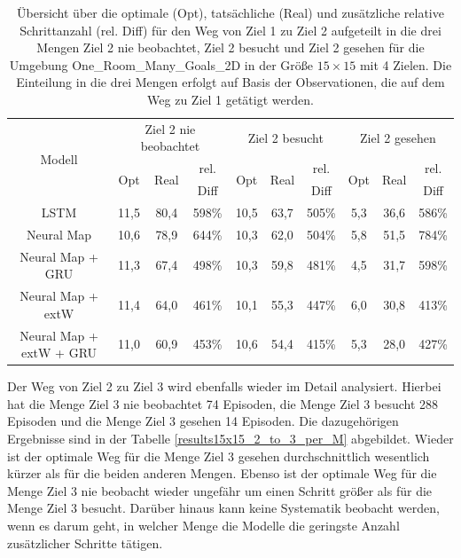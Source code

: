\begin{table}
  \begin{tabular}{|c|c|c|c|c|c|c|c|c|c|}
    \hline
    \multirow{3}{*}{Modell} & \multicolumn{3}{|c|}{Ziel 2 nie beobachtet} & \multicolumn{3}{|c|}{Ziel 2 besucht} & \multicolumn{3}{|c|}{Ziel 2 gesehen} \\ \cline{2-10}
    & \multirow{2}{*}{Opt} & \multirow{2}{*}{Real} & rel. & \multirow{2}{*}{Opt} & \multirow{2}{*}{Real} & rel. & \multirow{2}{*}{Opt} & \multirow{2}{*}{Real} & rel. \\
    & & & Diff & & & Diff & & & Diff \\ \hline
    LSTM & 11,5 & 80,4 & 598\% & 10,5 & 63,7 & 505\% & 5,3 & 36,6 & 586\% \\ \hline
    Neural Map & 10,6 & 78,9 & 644\% & 10,3 & 62,0 & 504\% & 5,8 & 51,5 & 784\% \\ \hline
    Neural Map + GRU & 11,3 & 67,4 & 498\% & 10,3 & 59,8 & 481\% & 4,5 & 31,7 & 598\% \\ \hline
    Neural Map + extW & 11,4 & 64,0 & 461\% & 10,1 & 55,3 & 447\% & 6,0 & 30,8 & 413\% \\ \hline
    Neural Map + extW + GRU & 11,0 & 60,9 & 453\% & 10,6 & 54,4 & 415\% & 5,3 & 28,0 & 427\% \\ \hline
  \end{tabular}
  \caption{Übersicht über die optimale (Opt), tatsächliche (Real) und zusätzliche relative Schrittanzahl (rel. Diff) für den Weg von Ziel 1 zu Ziel 2 aufgeteilt in die drei Mengen \glqq Ziel 2 nie beobachtet\grqq{}, \glqq Ziel 2 besucht\grqq{} und \glqq Ziel 2 gesehen\grqq{} für die Umgebung \glqq One\_Room\_Many\_Goals\_2D\grqq{} in der Größe $15 \times 15$ mit 4 Zielen. Die Einteilung in die drei Mengen erfolgt auf Basis der Observationen, die auf dem Weg zu Ziel 1 getätigt werden.}
  \label{results15x15_1_to_2_per_M}
\end{table}

Der Weg von Ziel 2 zu Ziel 3 wird ebenfalls wieder im Detail analysiert. Hierbei hat die Menge \glqq Ziel 3 nie beobachtet\grqq{} 74 Episoden, die Menge \glqq Ziel 3 besucht\grqq{} 288 Episoden und die Menge \glqq Ziel 3 gesehen\grqq{} 14 Episoden. Die dazugehörigen Ergebnisse sind in der Tabelle \ref{results15x15_2_to_3_per_M} abgebildet. Wieder ist der optimale Weg für die Menge \glqq Ziel 3 gesehen\grqq{} durchschnittlich wesentlich kürzer als für die beiden anderen Mengen. Ebenso ist der optimale Weg für die Menge \glqq Ziel 3 nie beobacht\grqq{} wieder ungefähr um einen Schritt größer als für die Menge \glqq Ziel 3 besucht\grqq{}. Darüber hinaus kann keine Systematik beobacht werden, wenn es darum geht, in welcher Menge die Modelle die geringste Anzahl zusätzlicher Schritte tätigen.

